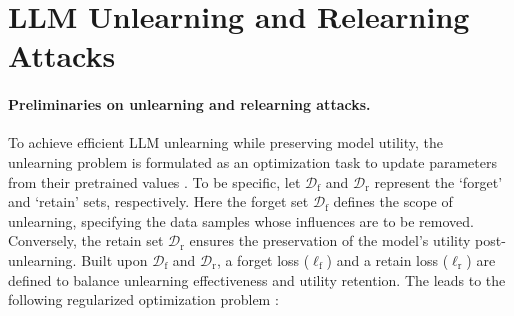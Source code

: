 \section{LLM Unlearning and Relearning Attacks}
\label{sec: preliminary}




\paragraph{Preliminaries on unlearning and relearning attacks.}
To achieve efficient LLM unlearning while preserving model utility, the unlearning problem is formulated as an optimization task to update parameters from their pretrained values \citep{eldan2023whos,yao2024large,maini2024tofu,zhang2024negative,li2024wmdp}.
%
To be specific, let $\mathcal{D}_{\mathrm{f}}$ and $\mathcal{D}_{\mathrm{r}}$ represent the `forget' and `retain' sets, respectively. Here the forget set $\mathcal{D}_{\mathrm{f}}$ defines the scope of unlearning, specifying the data samples whose influences are to be removed. Conversely, the retain set $\mathcal{D}_{\mathrm{r}}$ ensures the preservation of the model's utility post-unlearning. Built upon $\mathcal{D}_{\mathrm{f}}$ and $\mathcal{D}_{\mathrm{r}}$, a forget loss ($\ell_\mathrm{f}$) and a retain loss ($\ell_\mathrm{r}$) are defined to balance unlearning effectiveness and utility retention. The leads to the following regularized optimization problem \citep{liu2024rethinking}:
\vspace*{-2mm}
